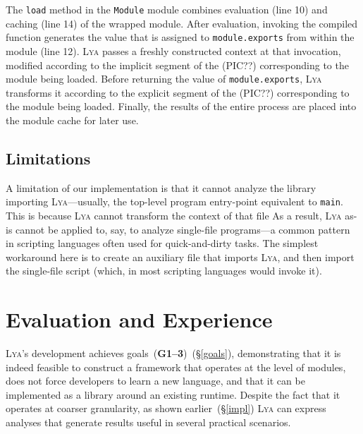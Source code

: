 \documentclass[letterpaper,twocolumn,10pt]{article}
\newcommand{\ttt}[1]{\texttt{#1}}
\newcommand{\sx}[1]{(\S\ref{#1})}
\newcommand{\sys}{{\scshape Lya}\xspace}
\newcommand{\goal}[1]{(\textbf{G#1})\xspace}
\begin{document}

The \ttt{load} method in the \ttt{Module} module combines evaluation (line 10) and caching (line 14) of the wrapped module.
After evaluation, invoking the compiled function generates the value that is assigned to \ttt{module.exports} from within the module (line 12).
\sys passes a freshly constructed context at that invocation, modified according to the implicit segment of the (PIC??) corresponding to the module being loaded.
Before returning the value of \ttt{module.exports}, \sys transforms it according to the explicit segment of the (PIC??) corresponding to the module being loaded.
Finally, the results of the entire process are placed into the module cache for later use.

\subsection{Limitations}

A limitation of our implementation is that it cannot analyze the library importing \sys---usually, the top-level program entry-point equivalent to \ttt{main}.
This is because \sys cannot transform the context of that file
As a result, \sys as-is cannot be applied to, say, to analyze single-file programs---a common pattern in scripting languages often used for quick-and-dirty tasks.
The simplest workaround here is to create an auxiliary file that imports \sys, and then import the single-file script (which, in most scripting languages would invoke it).



\section{Evaluation and Experience}
\label{eval}

\sys's  development achieves goals~\goal{1--3}~\sx{goals}, demonstrating that it is indeed feasible to construct a framework that operates at the level of modules, 
does not force developers to learn a new language, and that it can be implemented as a library around an existing runtime.
Despite the fact that it operates at coarser granularity, as shown earlier~\sx{impl} \sys can express analyses that generate results useful in several practical scenarios.
\end{document}
